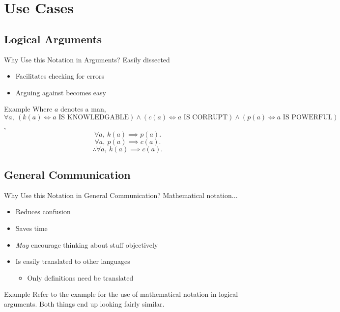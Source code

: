 \documentclass{beamer}
\begin{document}
	\section{Use Cases}
		\subsection{Logical Arguments}
			\begin{frame}{Why Use this Notation in Arguments?}
				Easily dissected
				\begin{itemize}
					\item Facilitates checking for errors
					\item Arguing against becomes easy
				\end{itemize}
			\end{frame}
			\begin{frame}{Example}
				Where $a$ denotes a man, \quad $\forall a, \ 
				\left(k\left(a\right) \iff \textrm{$a$ IS KNOWLEDGABLE}\right) \land
				\left(c\left(a\right) \iff a \textrm{ IS CORRUPT}\right) \land
				\left(p\left(a\right) \iff a \textrm{ IS POWERFUL}\right)$,
				\[
					\forall a, \ k\left(a\right) \implies p\left(a\right).
				\]
				\[
					\forall a, \ p\left(a\right) \implies c\left(a\right).
				\]
				\[
					\therefore \forall a, \ k\left(a\right) \implies c\left(a\right).
				\]
			\end{frame}
		\subsection{General Communication}
			\begin{frame}{Why Use this Notation in General Communication?}
				Mathematical notation...
				\begin{itemize}
					\item Reduces confusion
					\item Saves time
					\item \textit{May} encourage thinking about stuff objectively
					\item Is easily translated to other languages
					\begin{itemize}
						\item Only definitions need be translated
					\end{itemize}
				\end{itemize}
			\end{frame}
			\begin{frame}{Example}
				Refer to the example for the use of mathematical notation in 
        logical arguments.  Both things end up looking fairly similar.
			\end{frame}
\end{document}
